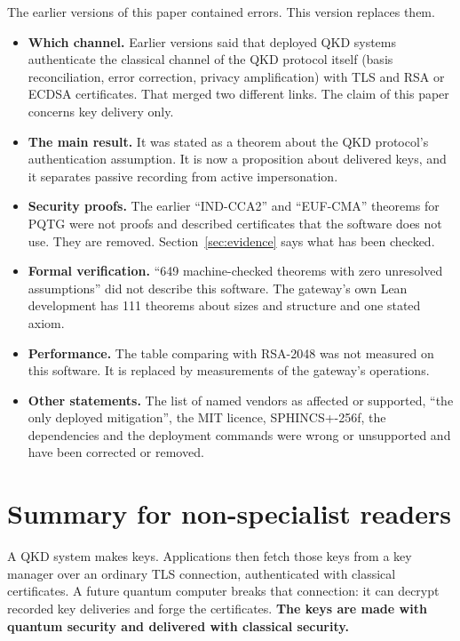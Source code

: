 \documentclass[11pt,letterpaper]{article}
\begin{document}
\begin{tcolorbox}[colback=gray!6!white, colframe=gray!60!black, title=\textbf{Corrections in this version (November 2026)}]
The earlier versions of this paper contained errors. This version replaces them.
\begin{itemize}
    \item \textbf{Which channel.} Earlier versions said that deployed QKD systems authenticate the classical channel of the QKD protocol itself (basis reconciliation, error correction, privacy amplification) with TLS and RSA or ECDSA certificates. That merged two different links. The claim of this paper concerns key delivery only.
    \item \textbf{The main result.} It was stated as a theorem about the QKD protocol's authentication assumption. It is now a proposition about delivered keys, and it separates passive recording from active impersonation.
    \item \textbf{Security proofs.} The earlier ``IND-CCA2'' and ``EUF-CMA'' theorems for PQTG were not proofs and described certificates that the software does not use. They are removed. Section~\ref{sec:evidence} says what has been checked.
    \item \textbf{Formal verification.} ``649 machine-checked theorems with zero unresolved assumptions'' did not describe this software. The gateway's own Lean development has 111 theorems about sizes and structure and one stated axiom.
    \item \textbf{Performance.} The table comparing with RSA-2048 was not measured on this software. It is replaced by measurements of the gateway's operations.
    \item \textbf{Other statements.} The list of named vendors as affected or supported, ``the only deployed mitigation'', the MIT licence, SPHINCS+-256f, the dependencies and the deployment commands were wrong or unsupported and have been corrected or removed.
\end{itemize}
\end{tcolorbox}

\newpage

\section*{Summary for non-specialist readers}

\begin{tcolorbox}[colback=red!5!white, colframe=red!60!black, title=\textbf{The problem}]
A QKD system makes keys. Applications then fetch those keys from a key manager over an ordinary TLS connection, authenticated with classical certificates. A future quantum computer breaks that connection: it can decrypt recorded key deliveries and forge the certificates. \textbf{The keys are made with quantum security and delivered with classical security.}
\end{tcolorbox}
\end{document}
